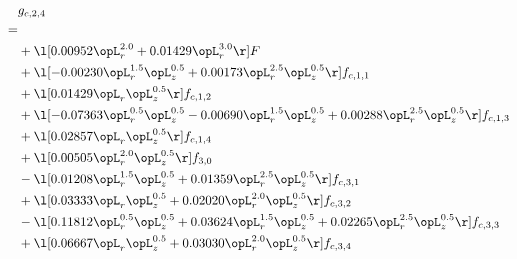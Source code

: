 \begin{alignat}{2} 
\label{eq:g_24_0} 
& g_{c,2,4} \nonumber \\ 
 = \\ 
& + \l[  0.00952 \opL_r^{2.0} +  0.01429 \opL_r^{3.0}  \r] F \nonumber \\ 
& + \l[  -0.00230 \opL_r^{1.5} \opL_z^{0.5} +  0.00173 \opL_r^{2.5} \opL_z^{0.5}  \r] f_{c,1,1} \nonumber \\ 
& + \l[  0.01429 \opL_r \opL_z^{0.5}  \r] f_{c,1,2} \nonumber \\ 
& + \l[  -0.07363 \opL_r^{0.5} \opL_z^{0.5}   -0.00690 \opL_r^{1.5} \opL_z^{0.5} +  0.00288 \opL_r^{2.5} \opL_z^{0.5}  \r] f_{c,1,3} \nonumber \\ 
& + \l[  0.02857 \opL_r \opL_z^{0.5}  \r] f_{c,1,4} \nonumber \\ 
& + \l[  0.00505 \opL_r^{2.0} \opL_z^{0.5}  \r] f_{3,0} \nonumber \\ 
& - \l[  0.01208 \opL_r^{1.5} \opL_z^{0.5} +  0.01359 \opL_r^{2.5} \opL_z^{0.5}  \r] f_{c,3,1} \nonumber \\ 
& + \l[  0.03333 \opL_r \opL_z^{0.5} +  0.02020 \opL_r^{2.0} \opL_z^{0.5}  \r] f_{c,3,2} \nonumber \\ 
& - \l[  0.11812 \opL_r^{0.5} \opL_z^{0.5} +  0.03624 \opL_r^{1.5} \opL_z^{0.5} +  0.02265 \opL_r^{2.5} \opL_z^{0.5}  \r] f_{c,3,3} \nonumber \\ 
& + \l[  0.06667 \opL_r \opL_z^{0.5} +  0.03030 \opL_r^{2.0} \opL_z^{0.5}  \r] f_{c,3,4} \nonumber \\ 
\end{alignat} 


